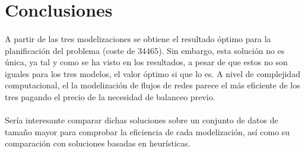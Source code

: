 \documentclass[a4paper, spanish]{article}
\begin{document}
  \section{Conclusiones}
  \label{section:conclusions}

    \paragraph{}
    A partir de las tres modelizaciones se obtiene el resultado óptimo para la planificación del problema (coste de \textbf{$34465$}). Sin embargo, esta solución no es única, ya tal y como se ha visto en los resultados, a pesar de que estos no son iguales para los tres modelos, el valor óptimo si que lo es. A nivel de complejidad computacional, el la modelización de flujos de redes parece el más eficiente de los tres pagando el precio de la necesidad de balanceo previo.

    \paragraph{}
    Sería interesante comparar dichas soluciones sobre un conjunto de datos de tamaño mayor para comprobar la eficiencia de cada modelización, así como su comparación con soluciones basadas en heurísticas.
\end{document}
